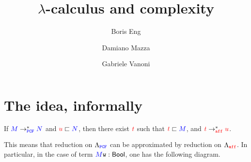 \documentclass{article}
\begin{document}
	\title{$\lambda$-calculus and complexity}
	\author{Boris Eng\and Damiano Mazza\and Gabriele Vanoni}
	\maketitle
	\section{The idea, informally}
	\begin{theorem}[Continuity]
		If $\Tm\topcf^*\Tmtwo$ and $\tmtwo\appr\Tmtwo$, then there exist $\tm$ such that $\tm\appr\Tm$, and $\tm\toaff^*\tmtwo$.
	\end{theorem}
	This means that reduction on $\Pcf$ can be approximated by reduction on $\Aff$. In particular, in the case of term $\Tm\wo:\Bool$, one has the following diagram.
	
\end{document}
